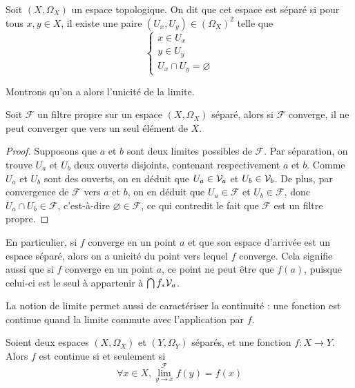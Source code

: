 \begin{definition}
  Soit $(X,\Omega_X)$ un espace topologique. On dit que cet espace est séparé
  si pour tous $x,y\in X$, il existe une paire $(U_x,U_y)\in (\Omega_X)^2$ telle
  que
  \[\begin{cases}
  x\in U_x\\
  y\in U_y\\
  U_x\cap U_y = \varnothing
  \end{cases}\]
\end{definition}

Montrons qu'on a alors l'unicité de la limite.

\begin{proposition}
  Soit $\mathcal F$ un filtre propre sur un espace $(X,\Omega_X)$ séparé, alors
  si $\mathcal F$ converge, il ne peut converger que vers un seul élément de
  $X$.
\end{proposition}

\begin{proof}
  Supposons que $a$ et $b$ sont deux limites possibles de $\mathcal F$. Par
  séparation, on trouve $U_a$ et $U_b$ deux ouverts disjoints, contenant
  respectivement $a$ et $b$. Comme $U_a$ et $U_b$ sont des ouverts, on en déduit
  que $U_a\in\mathcal{V}_a$ et $U_b\in\mathcal{V}_b$. De plus, par convergence de
  $\mathcal F$ vers $a$ et $b$, on en déduit que $U_a\in\mathcal F$ et
  $U_b\in\mathcal F$, donc $U_a\cap U_b\in\mathcal F$, c'est-à-dire
  $\varnothing\in\mathcal F$, ce qui contredit le fait que $\mathcal F$ est
  un filtre propre.
\end{proof}

En particulier, si $f$ converge en un point $a$ et que son espace d'arrivée est
un espace séparé, alors on a unicité du point vers lequel $f$ converge. Cela
signifie aussi que si $f$ converge en un point $a$, ce point ne peut être que
$f(a)$, puisque celui-ci est le seul à appartenir à $\bigcap f_*\mathcal{V}_a$.

La notion de limite permet aussi de caractériser la continuité : une fonction
est continue quand la limite commute avec l'application par $f$.

\begin{property}\label{prop.carac.cont.fil}
  Soient deux espaces $(X,\Omega_X)$ et $(Y,\Omega_Y)$ séparés, et une fonction
  $f : X \to Y$. Alors $f$ est continue si et seulement si
  \[\forall x \in X, \lim_{y \to x}^\mathcal F f(y) = f(x)\]
\end{property}

